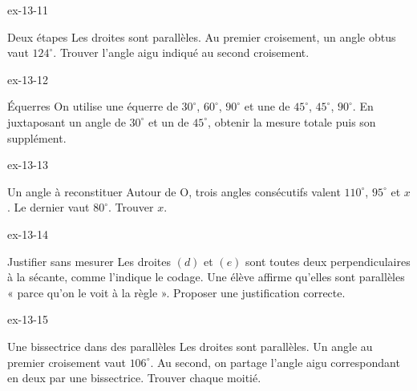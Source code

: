 \begin{blocLivre}{ex-13-11}\begin{exercice}[3]{Deux étapes}
Les droites sont parallèles. Au premier croisement, un angle obtus vaut $124^\circ$. Trouver l’angle aigu indiqué au second croisement.
\label{fig-ex-13-11}
\end{exercice}\end{blocLivre}
\begin{blocLivre}{ex-13-12}\begin{exercice}[3]{Équerres}
On utilise une équerre de $30^\circ$, $60^\circ$, $90^\circ$ et une de $45^\circ$, $45^\circ$, $90^\circ$. En juxtaposant un angle de $30^\circ$ et un de $45^\circ$, obtenir la mesure totale puis son supplément.
\label{fig-ex-13-12}
\end{exercice}\end{blocLivre}
\begin{blocLivre}{ex-13-13}\begin{exercice}[3]{Un angle à reconstituer}
Autour de O, trois angles consécutifs valent $110^\circ$, $95^\circ$ et $x$. Le dernier vaut $80^\circ$. Trouver $x$.
\label{fig-ex-13-13}
\end{exercice}\end{blocLivre}
\begin{blocLivre}{ex-13-14}\begin{exercice}[3]{Justifier sans mesurer}
Les droites $(d)$ et $(e)$ sont toutes deux perpendiculaires à la sécante, comme l’indique le codage. Une élève affirme qu’elles sont parallèles « parce qu’on le voit à la règle ». Proposer une justification correcte.
\label{fig-ex-13-14}
\end{exercice}\end{blocLivre}
\begin{blocLivre}{ex-13-15}\begin{exercice}[3]{Une bissectrice dans des parallèles}
Les droites sont parallèles. Un angle au premier croisement vaut $106^\circ$. Au second, on partage l’angle aigu correspondant en deux par une bissectrice. Trouver chaque moitié.
\label{fig-ex-13-15}
\end{exercice}\end{blocLivre}

\clearpage
